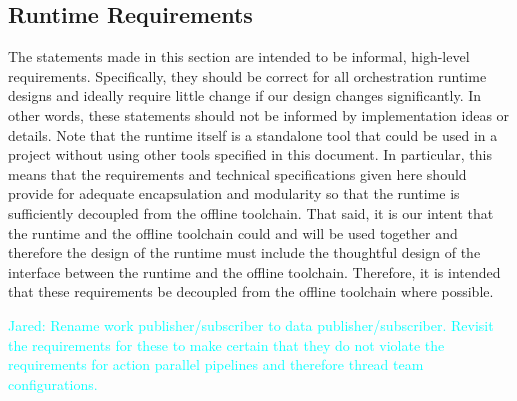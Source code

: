 \documentclass{article}
\newcommand{\Jared}[1]          {\textcolor{cyan}{Jared: #1}}
\begin{document}
%
%
%
%
%

\subsection{Runtime Requirements}
The statements made in this section are intended to be informal, high-level
requirements.  Specifically, they should be correct for all orchestration
runtime designs and ideally require little change if our design changes
significantly.  In other words, these statements should not be informed by
implementation ideas or details.  Note that the runtime itself is a standalone
tool that could be used in a project without using other tools specified in this
document.  In particular, this means that the requirements and technical
specifications given here should provide for adequate encapsulation and
modularity so that the runtime is sufficiently decoupled from the offline
toolchain.  That said, it is our intent that the runtime and the offline
toolchain could and will be used together and therefore the design of the
runtime must include the thoughtful design of the interface between the runtime
and the offline toolchain.  Therefore, it is intended that these requirements
be decoupled from the offline toolchain where possible.

\Jared{Rename work publisher/subscriber to data publisher/subscriber.  Revisit
the requirements for these to make certain that they do not violate the
requirements for action parallel pipelines and therefore thread team
configurations.}
\end{document}
